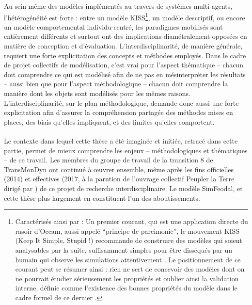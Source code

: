 Au sein même des modèles implémentés au travers de systèmes multi-agents, l'hétérogénéité est forte : entre un modèle KISS\footnote{
	Caractérisés ainsi par \textcite[110]{amblard_evaluation_2006} : 
	\og Un premier courant, qui est une application directe du rasoir d'Occam, aussi appelé  ``principe de parcimonie'', le mouvement KISS (Keep It Simple, Stupid !) recommande de construire des modèles qui soient analysables par la suite, suffisamment simples pour être disséqués par un humain qui observe les simulations attentivement \textelp{}.
	Le positionnement de ce courant peut se résumer ainsi : rien ne sert de concevoir des modèles dont on ne pourrait étudier sérieusement les propriétés et oublier ainsi la validation interne, définie comme l'existence des bonnes propriétés du modèle dans le cadre formel de ce dernier
	\fg{}.
}, un modèle descriptif, ou encore un modèle comportemental individu-centré, les paradigmes mobilisés sont entièrement différents et surtout ont des implications diamétralement opposées en matière de conception et d'évaluation.
L'interdisciplinarité, de manière générale, requiert une forte explicitation des concepts et méthodes employés.
Dans le cadre de projet collectifs de modélisation, c'est vrai pour l'aspect thématique -- chacun doit comprendre ce qui est modélisé afin de ne pas en mésinterpréter les résultats -- aussi bien que pour l'aspect méthodologique -- chacun doit comprendre la manière dont les objets sont modélisés pour les mêmes raisons.
L'interdisciplinarité, sur le plan méthodologique, demande donc aussi une forte explicitation afin d'assurer la compréhension partagée des méthodes mises en places, des biais qu'elles impliquent, et des limites qu'elles comportent.

%

\bigskip
\paragraph[Conclusion intermédiaire]{}

Le contexte dans lequel cette thèse a été imaginée et initiée, retracé dans cette partie, permet de mieux comprendre les enjeux -- méthodologiques et thématiques -- de ce travail.
Les membres du groupe de travail de la \og transition 8\fg{} de TransMonDyn ont continué à œuvrer ensemble, même après les fins officielles (2014) et effectives (2017, à la parution de l'ouvrage collectif \og Peupler la Terre\fg{} dirigé par \textcite{sanders2018peupler}) de ce projet de recherche interdisciplinaire.
Le modèle SimFeodal, et cette thèse plus largement en constituent l'un des aboutissements.

